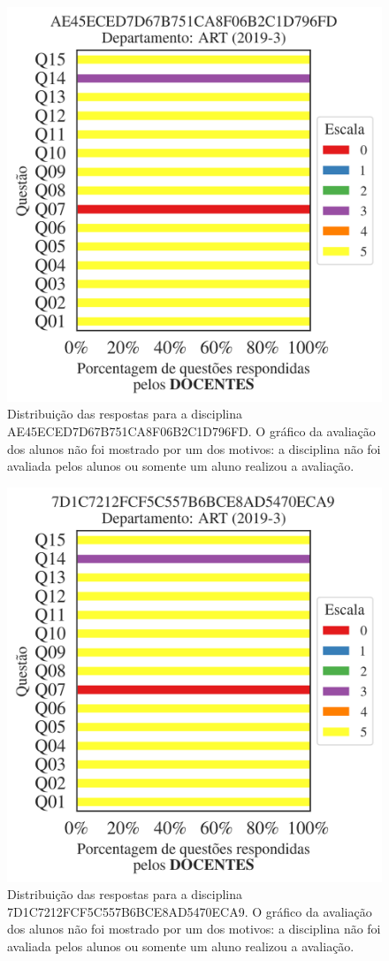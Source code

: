 \documentclass[a4paper,10pt]{article}
\begin{document}
\begin{figure}[h]
\centering
\includegraphics[width=0.485\linewidth]{analise_disciplina_departamento_ART_AE45ECED7D67B751CA8F06B2C1D796FD_docentes.png}
\caption{\label{fig:analise_geral_departamento}                Distribuição das respostas para a disciplina AE45ECED7D67B751CA8F06B2C1D796FD. O gráfico da avaliação dos alunos não foi mostrado  por um dos motivos:  a disciplina não foi avaliada pelos alunos ou somente um aluno realizou a avaliação. }
\end{figure}
\begin{figure}[h]
\centering
\includegraphics[width=0.485\linewidth]{analise_disciplina_departamento_ART_7D1C7212FCF5C557B6BCE8AD5470ECA9_docentes.png}
\caption{\label{fig:analise_geral_departamento}                Distribuição das respostas para a disciplina 7D1C7212FCF5C557B6BCE8AD5470ECA9. O gráfico da avaliação dos alunos não foi mostrado  por um dos motivos:  a disciplina não foi avaliada pelos alunos ou somente um aluno realizou a avaliação. }
\end{figure}
\end{document}
